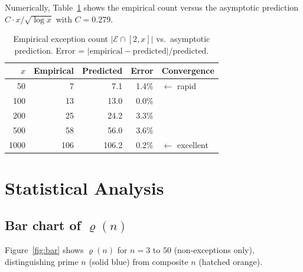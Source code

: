 \documentclass[12pt]{amsart}
\theoremstyle{bluehead}
\theoremstyle{orangehead}
\theoremstyle{greenhead}
\newcommand{\Exc}{\mathcal{E}}
\begin{document}
Numerically, Table~\ref{tab:exc-asymp} shows the empirical count versus
the asymptotic prediction $C\cdot x/\sqrt{\log x}$ with $C=0.279$.

\begin{table}[!ht]
\centering
\caption{Empirical exception count $|\Exc\cap[2,x]|$ vs.\
asymptotic prediction.  Error = $|\text{empirical}-\text{predicted}|/\text{predicted}$.}
\label{tab:exc-asymp}
\small
\begin{tabular}{@{}rrrrl@{}}
\toprule
$x$ & Empirical & Predicted & Error & Convergence\\
\midrule
   50 &  7 &  7.1 & 1.4\% & $\leftarrow$ rapid\\
  100 & 13 & 13.0 & 0.0\% & \\
  200 & 25 & 24.2 & 3.3\% & \\
  500 & 58 & 56.0 & 3.6\% & \\
 1000 & 106 & 106.2 & 0.2\% & $\leftarrow$ excellent\\
\bottomrule
\end{tabular}
\end{table}

\section{Statistical Analysis}\label{sec:stats}

\subsection{Bar chart of \texorpdfstring{$\varrho(n)$}{rho(n)}}

Figure~\ref{fig:bar} shows $\varrho(n)$ for $n=3$ to $50$
(non-exceptions only), distinguishing prime $n$ (solid blue) from
composite $n$ (hatched orange).
\end{document}
